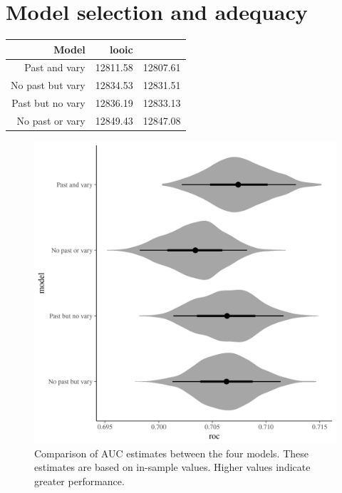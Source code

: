 \documentclass[12pt,letterpaper]{article}
\begin{document}
\section{Model selection and adequacy}

\begin{table}[ht]
  \centering
  \begin{tabular}{rrr}
    \hline
    Model & looic \\
    \hline
    Past and vary & 12811.58 & 12807.61 \\
    No past but vary & 12834.53 & 12831.51 \\
    Past but no vary & 12836.19 & 12833.13 \\
    No past or vary & 12849.43 & 12847.08 \\
    \hline
  \end{tabular}
  \label{tab:selection}
\end{table}

\begin{figure}[ht]
  \centering
  \includegraphics[width=\textwidth,height=0.5\textheight,keepaspectratio=true]{figure/roc_hist}
  \caption{Comparison of AUC estimates between the four models. These estimates are based on in-sample values. Higher values indicate greater performance.}
  \label{fig:roc_hist}
\end{figure}
\end{document}

